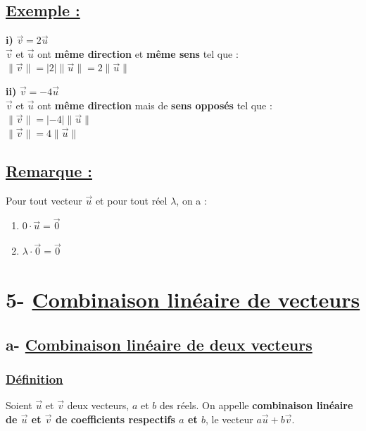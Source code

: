\documentclass{article}
\begin{document}
\subsection*{\underline{\color{red}Exemple :}}

\noindent \textbf{i)} $\vec{v} = 2 \vec{u}$ \\
$\vec{v}$ et $\vec{u}$ ont \textbf{même direction} et \textbf{même sens} tel que : \\
$\|\vec{v}\| = |2| \|\vec{u}\| = 2 \|\vec{u}\|$

\vspace{1.5em}

\noindent \textbf{ii)} $\vec{v} = -4 \vec{u}$ \\
$\vec{v}$ et $\vec{u}$ ont \textbf{même direction} mais de \textbf{sens opposés} tel que : \\
$\|\vec{v}\| = |-4| \|\vec{u}\|$ \\
$\|\vec{v}\| = 4 \|\vec{u}\|$

\subsection*{\underline{\color{red}Remarque :}}

\noindent Pour tout vecteur $\vec{u}$ et pour tout réel $\lambda$, on a :

\begin{enumerate}
    \item[i)] $0 \cdot \vec{u} = \vec{0}$
    \item[ii)] $\lambda \cdot \vec{0} = \vec{0}$
\end{enumerate}
\section*{5- \underline{Combinaison linéaire de vecteurs}}

\subsection*{a- \underline{Combinaison linéaire de deux vecteurs}}

\subsubsection*{\underline{\color{red}Définition}}

\noindent Soient $\vec{u}$ et $\vec{v}$ deux vecteurs, $a$ et $b$ des réels. On appelle \textbf{combinaison linéaire de $\vec{u}$ et $\vec{v}$ de coefficients respectifs $a$ et $b$}, le vecteur $a\vec{u} + b\vec{v}$.
\end{document}
